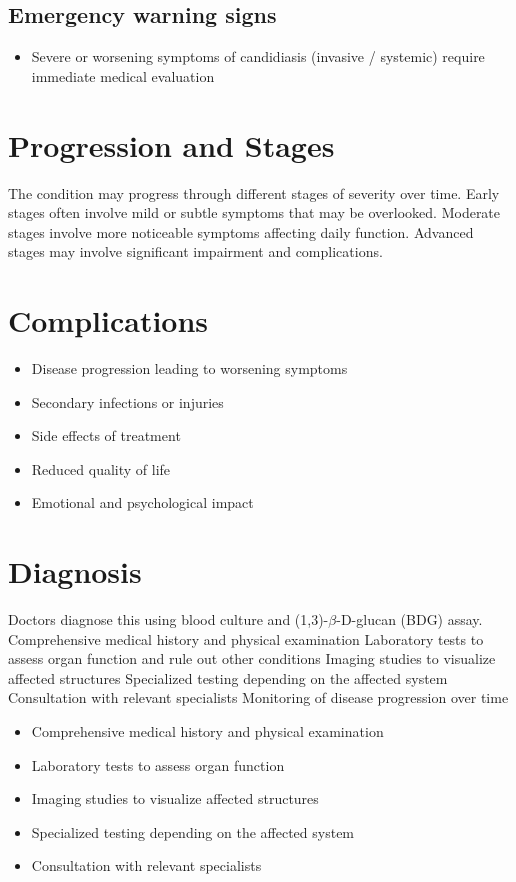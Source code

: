 \subsection{Emergency warning signs}
\begin{itemize}[noitemsep]
  \item Severe or worsening symptoms of candidiasis (invasive / systemic) require immediate medical evaluation
\end{itemize}
\section{Progression and Stages}
The condition may progress through different stages of severity over time. Early stages often involve mild or subtle symptoms that may be overlooked. Moderate stages involve more noticeable symptoms affecting daily function. Advanced stages may involve significant impairment and complications.
\section{Complications}
\begin{itemize}[noitemsep]
  \item Disease progression leading to worsening symptoms
  \item Secondary infections or injuries
  \item Side effects of treatment
  \item Reduced quality of life
  \item Emotional and psychological impact
\end{itemize}
\section{Diagnosis}
Doctors diagnose this using blood culture and (1,3)-$\beta$-D-glucan (BDG) assay. Comprehensive medical history and physical examination Laboratory tests to assess organ function and rule out other conditions Imaging studies to visualize affected structures Specialized testing depending on the affected system Consultation with relevant specialists Monitoring of disease progression over time

\begin{itemize}[noitemsep]
  \item Comprehensive medical history and physical examination
  \item Laboratory tests to assess organ function
  \item Imaging studies to visualize affected structures
  \item Specialized testing depending on the affected system
  \item Consultation with relevant specialists
\end{itemize}
